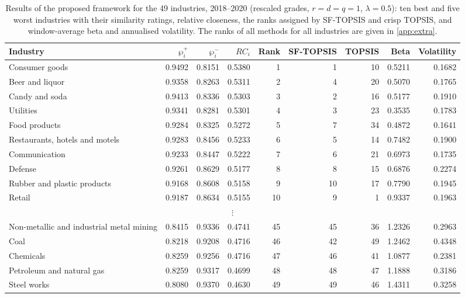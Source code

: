 \begin{table}[!htbp]
\centering
\scriptsize
\caption{Results of the proposed framework for the 49 industries, 2018--2020 (rescaled grades, $r=d=q=1$, $\lambda=0.5$): ten best and five worst industries with their similarity ratings, relative closeness, the ranks assigned by SF-TOPSIS and crisp TOPSIS, and window-average beta and annualised volatility. The ranks of all methods for all industries are given in \ref{app:extra}.}\label{tab:main}
\begin{adjustbox}{max width=\textwidth}
\begin{tabular}{lrrrrrrrr}
\toprule
Industry & $\wp_i^{+}$ & $\wp_i^{-}$ & $RC_i$ & Rank & SF-TOPSIS & TOPSIS & Beta & Volatility \\
\midrule
Consumer goods & 0.9492 & 0.8151 & 0.5380 & 1 & 1 & 10 & 0.5211 & 0.1682 \\
Beer and liquor & 0.9358 & 0.8263 & 0.5311 & 2 & 4 & 20 & 0.5070 & 0.1765 \\
Candy and soda & 0.9413 & 0.8336 & 0.5303 & 3 & 2 & 16 & 0.5177 & 0.1910 \\
Utilities & 0.9341 & 0.8281 & 0.5301 & 4 & 3 & 23 & 0.3535 & 0.1783 \\
Food products & 0.9284 & 0.8325 & 0.5272 & 5 & 7 & 34 & 0.4872 & 0.1641 \\
Restaurants, hotels and motels & 0.9283 & 0.8456 & 0.5233 & 6 & 5 & 14 & 0.7482 & 0.1900 \\
Communication & 0.9233 & 0.8447 & 0.5222 & 7 & 6 & 21 & 0.6973 & 0.1735 \\
Defense & 0.9261 & 0.8629 & 0.5177 & 8 & 8 & 15 & 0.6876 & 0.2274 \\
Rubber and plastic products & 0.9168 & 0.8608 & 0.5158 & 9 & 10 & 17 & 0.7790 & 0.1945 \\
Retail & 0.9187 & 0.8634 & 0.5155 & 10 & 9 & 1 & 0.9337 & 0.1963 \\
\multicolumn{9}{c}{$\vdots$}\\
Non-metallic and industrial metal mining & 0.8415 & 0.9336 & 0.4741 & 45 & 45 & 36 & 1.2326 & 0.2963 \\
Coal & 0.8218 & 0.9208 & 0.4716 & 46 & 42 & 49 & 1.2462 & 0.4348 \\
Chemicals & 0.8259 & 0.9256 & 0.4716 & 47 & 46 & 41 & 1.0877 & 0.2381 \\
Petroleum and natural gas & 0.8259 & 0.9317 & 0.4699 & 48 & 48 & 47 & 1.1888 & 0.3186 \\
Steel works & 0.8080 & 0.9370 & 0.4630 & 49 & 49 & 46 & 1.4311 & 0.3258 \\
\bottomrule
\end{tabular}
\end{adjustbox}
\end{table}
